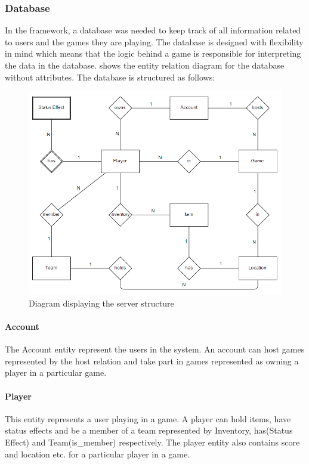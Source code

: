 \subsubsection{Database}\label{subsec:databasedesign}

In the framework, a database was needed to keep track of all information related to users and the games they are playing. The database is designed with flexibility in mind which means that the logic behind a game is responsible for interpreting the data in the database.  shows the entity relation diagram for the database without attributes. The database is structured as follows:

\begin{figure}[H]
  \centering
  \includegraphics[width=\textwidth]{billeder/serverdiagram.png}  
  \caption{Diagram displaying the server structure}
  \label{fig:erdiagram}
\end{figure}

\paragraph{Account}
The Account entity represent the users in the system. An account can host games represented by the host relation and take part in games represented as owning a player in a particular game.

\paragraph{Player}
This entity represents a user playing in a game. A player can hold items, have status effects and be a member of a team represented by Inventory, has(Status Effect) and Team(is\_member) respectively. The player entity also contains score and location etc. for a particular player in a game.


